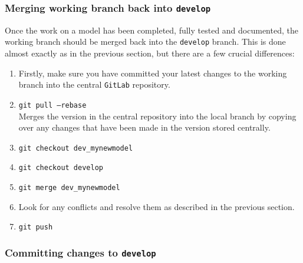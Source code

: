 \documentclass[11pt,a4paper]{report}
\begin{document}
\subsubsection{Merging working branch back into \texttt{develop}}

Once the work on a model has been completed, fully tested and documented, the
working branch should be merged back into the \texttt{develop} branch. This is
done almost exactly as in the previous section, but there are a few crucial
differences:

\begin{enumerate}

\item Firstly, make sure you have committed your latest changes to the working
  branch into the central \texttt{GitLab} repository.

\item \texttt{git pull --rebase}\\
Merges the version in the central repository into the local branch by copying over any changes that have been made in the version stored centrally.

\item \texttt{git checkout dev\_mynewmodel}

\item \texttt{git checkout develop}

\item \texttt{git merge dev\_mynewmodel}

\item Look for any conflicts and resolve them as described in the previous
  section.

\item \texttt{git push}

\end{enumerate}

\subsubsection{Committing changes to \texttt{develop}}
\end{document}
